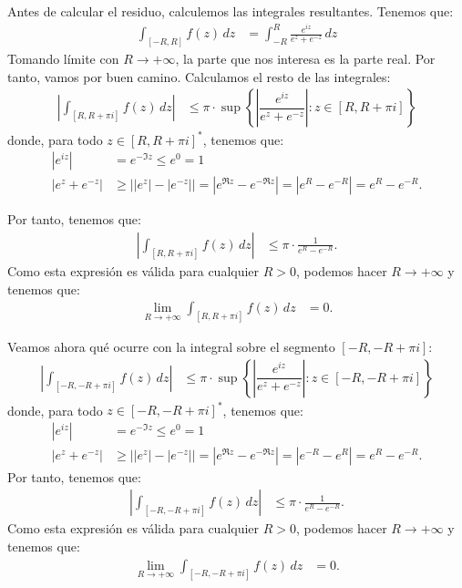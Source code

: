 \begin{ejercicio}
    Antes de calcular el residuo, calculemos las integrales resultantes. Tenemos que:
    \begin{align*}
        \int_{[-R, R]} f(z) \, dz &= \int_{-R}^{R} \frac{e^{iz}}{e^z + e^{-z}} \, dz
    \end{align*}
    Tomando límite con $R\to +\infty$, la parte que nos interesa es la parte real. Por tanto, vamos por buen camino. Calculamos el resto de las integrales:
    \begin{align*}
        \left|\int_{[R, R + \pi i]} f(z) \, dz\right| &\leq \pi\cdot \sup\left\{\left|\dfrac{e^{iz}}{e^z + e^{-z}}\right| : z\in [R, R + \pi i]\right\}
    \end{align*}
    donde, para todo $z\in [R, R + \pi i]^*$, tenemos que:
    \begin{align*}
        |e^{iz}| &= e^{-\Im z}\leq e^0=1\\
        |e^z + e^{-z}| &\geq \left||e^z| - |e^{-z}|\right| = \left|e^{\Re z} - e^{-\Re z}\right| = \left|e^{R} - e^{-R}\right| = e^{R} - e^{-R}.
    \end{align*}

    Por tanto, tenemos que:
    \begin{align*}
        \left|\int_{[R, R + \pi i]} f(z) \, dz\right| &\leq \pi\cdot \frac{1}{e^{R} - e^{-R}}.
    \end{align*}
    Como esta expresión es válida para cualquier $R > 0$, podemos hacer $R \to +\infty$ y tenemos que:
    \begin{align*}
        \lim_{R\to+\infty} \int_{[R, R + \pi i]} f(z) \, dz &= 0.
    \end{align*}

    Veamos ahora qué ocurre con la integral sobre el segmento $[-R, -R + \pi i]$:
    \begin{align*}
        \left|\int_{[-R, -R + \pi i]} f(z) \, dz\right| &\leq \pi\cdot \sup\left\{\left|\dfrac{e^{iz}}{e^z + e^{-z}}\right| : z\in [-R, -R + \pi i]\right\}
    \end{align*}
    donde, para todo $z\in [-R, -R + \pi i]^*$, tenemos que:
    \begin{align*}
        |e^{iz}| &= e^{-\Im z}\leq e^0=1\\
        |e^z + e^{-z}| &\geq \left||e^z| - |e^{-z}|\right| = \left|e^{\Re z} - e^{-\Re z}\right| = \left|e^{-R} - e^{R}\right| = e^{R} - e^{-R}.
    \end{align*}
    Por tanto, tenemos que:
    \begin{align*}
        \left|\int_{[-R, -R + \pi i]} f(z) \, dz\right| &\leq \pi\cdot \frac{1}{e^{R} - e^{-R}}.
    \end{align*}
    Como esta expresión es válida para cualquier $R > 0$, podemos hacer $R \to +\infty$ y tenemos que:
    \begin{align*}
        \lim_{R\to+\infty} \int_{[-R, -R + \pi i]} f(z) \, dz &= 0.
    \end{align*}





\end{ejercicio}
